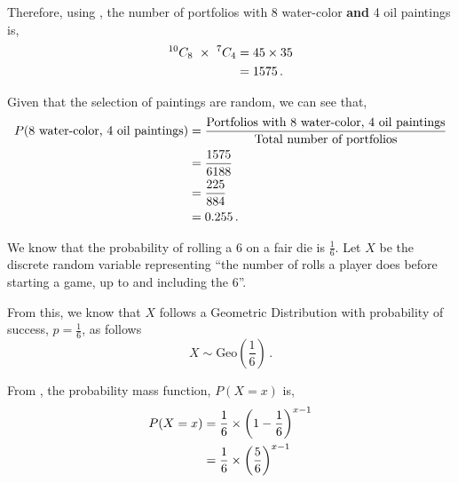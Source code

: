 \begin{subquestions}
\begin{subsubquestions}
Therefore, using , the number of portfolios with 8 water-color \textbf{and} 4 oil paintings is,
\begin{align}
	^{10}C_{8} ~\times ~ ^7C_{4} & = 45 \times 35 \nonumber \\
	                            & = 1575 \,.
\end{align}


\subsubquestion

Given that the selection of paintings are random, we can see that,
\begin{align}
	P(\text{8 water-color, 4 oil paintings}) & = \frac{\text{Portfolios with 8 water-color, 4 oil paintings}}{\text{Total number of portfolios}} \nonumber \\
	                                            & = \frac{1575}{6188} \nonumber \\
	                                            & = \frac{225}{884} \nonumber \\
	                                            & = 0.255 \,.
\end{align}

\end{subsubquestions}
	

\subquestion

We know that the probability of rolling a 6 on a fair die is $\frac{1}{6}$. Let $X$ be the discrete random variable representing ``the number of rolls a player does before starting a game, up to and including the 6''.

From this, we know that $X$ follows a Geometric Distribution with probability of success, $p=\frac{1}{6}$, as follows
\begin{equation}
	X \sim \text{Geo} \left(\frac{1}{6} \right) \,.
\end{equation}

\begin{subsubquestions}
	
\subquestion

From , the probability mass function, $P(X=x)$ is,
\begin{align}
	P(X = x) & = \frac{1}{6} \times \left(1-\frac{1}{6} \right)^{x-1} \nonumber \\
	         & = \frac{1}{6} \times \left(\frac{5}{6} \right)^{x-1}
\end{align}
	

\end{subsubquestions}
\end{subquestions}
